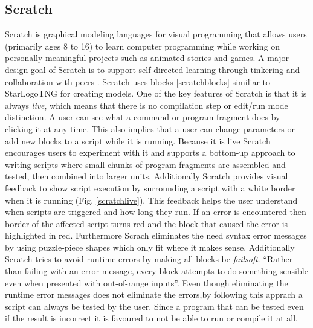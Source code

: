 \documentclass[runningheads,a4paper]{llncs}
\begin{document}

   \subsection{Scratch}
  Scratch is graphical modeling languages for visual programming that allows users (primarily ages 8 to 16\cite{maloney2010scratch}) to learn
  computer programming while working on personally meaningful projects such as animated stories and games. 
  A major design goal of Scratch is to support self-directed learning through tinkering and collaboration with peers \cite{maloney2010scratch}. 
  Scratch uses blocks \ref{scratchblocks} similiar to StarLogoTNG for creating models. One of the key features of Scratch is that it is always \emph{live},
  which means that there is no compilation step or edit/run mode distinction. A user can see what a command or program fragment does by clicking 
  it at any time. This also implies that a user can change parameters or add new blocks to a script while it is running.
  Because it is live Scratch encourages users to experiment with it and supports
  a bottom-up approach to writing scripts where small chunks of program fragments are assembled and tested, then combined into larger units.
  Additionally Scratch provides visual feedback to show script execution by surrounding a script with a white border when it is 
  running (Fig. \ref{scratchlive}). This feedback
  helps the user understand when scripts are triggered and how long they run. If an error is encountered then border of the 
  affected script turns red and the block that caused the error is highlighted in red. 
  Furthermore Scrach eliminates the need syntax error messages by using 
  puzzle-piece shapes which only fit where it makes sense. Additionally Scratch tries to avoid runtime errors by making all blocks be
  \textit{failsoft}. ``Rather than failing with an error message, every block attempts to do something sensible even when presented with out-of-range inputs''\cite{maloney2010scratch}.
  Even though eliminating the runtime error messages does not eliminate the errors,by following this apprach a script can always be tested by the user.
  Since a program that can be tested even if the result is incorrect it is favoured to not be able to run or compile it at all.
\end{document}
